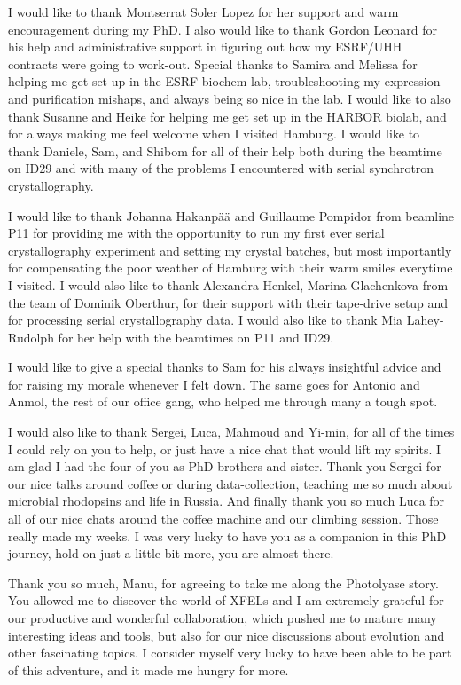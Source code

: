 \documentclass{report}
\begin{document}
I would like to thank Montserrat Soler Lopez for her support and warm encouragement during my PhD. I also would like to thank Gordon Leonard for his help and administrative support in figuring out how my ESRF/UHH contracts were going to work-out. Special thanks to Samira and Melissa for helping me get set up in the ESRF biochem lab, troubleshooting my expression and purification mishaps, and always being so nice in the lab. I would like to also thank Susanne and Heike for helping me get set up in the HARBOR biolab, and for always making me feel welcome when I visited Hamburg. I would like to thank Daniele, Sam, and Shibom for all of their help both during the beamtime on ID29 and with many of the problems I encountered with serial synchrotron crystallography. 

I would like to thank Johanna Hakanpää and Guillaume Pompidor from beamline P11 for providing me with the opportunity to run my first ever serial crystallography experiment and setting my crystal batches, but most importantly for compensating the poor weather of Hamburg with their warm smiles everytime I visited. I would also like to thank Alexandra Henkel, Marina Glachenkova from the team of Dominik Oberthur, for their support with their tape-drive setup and for processing serial crystallography data. I would also like to thank Mia Lahey-Rudolph for her help with the beamtimes on P11 and ID29. 

I would like to give a special thanks to Sam for his always insightful advice and for raising my morale whenever I felt down. The same goes for Antonio and Anmol, the rest of our office gang, who helped me through many a tough spot. 

I would also like to thank Sergei, Luca, Mahmoud and Yi-min, for all of the times I could rely on you to help, or just have a nice chat that would lift my spirits. I am glad I had the four of you as PhD brothers and sister. Thank you Sergei for our nice talks around coffee or during data-collection, teaching me so much about microbial rhodopsins and life in Russia. And finally thank you so much Luca for all of our nice chats around the coffee machine and our climbing session. Those really made my weeks. I was very lucky to have you as a companion in this PhD journey, hold-on just a little bit more, you are almost there. 




Thank you so much, Manu, for agreeing to take me along the Photolyase story. You allowed me to discover the world of XFELs and I am extremely grateful for our productive and wonderful collaboration, which pushed me to mature many interesting ideas and tools, but also for our nice discussions about evolution and other fascinating topics. I consider myself very lucky to have been able to be part of this adventure, and it made me hungry for more. 
\end{document}
